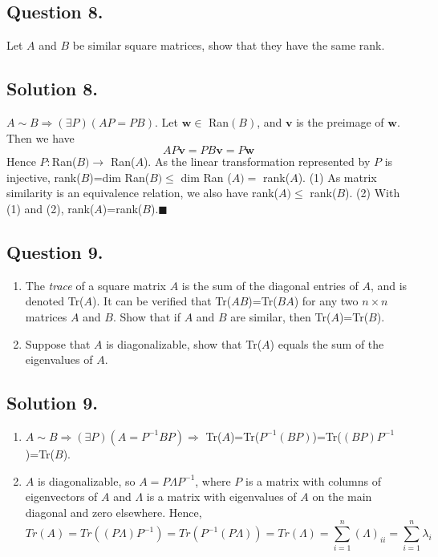 \documentclass{article}
\begin{document}
\subsection*{Question 8.}
Let $A$ and $B$ be similar square matrices, show that they have the same rank.
\subsection*{Solution 8.}
$A\sim B\Rightarrow (\exists P)(AP=PB)$.
Let $\mathbf{w}\in$ Ran$(B)$, and $\mathbf{v}$ is the preimage of $\mathbf{w}$. Then we have
\[AP\mathbf{v}=PB\mathbf{v}=P\mathbf{w}\]
Hence $P:$Ran($B)\to$ Ran($A$). \newline
As the linear transformation represented by $P$ is injective,\newline
rank($B$)=dim Ran($B)\leq$ dim Ran ($A)=$ rank($A$). (1) \newline
As matrix similarity is an equivalence relation, we also have rank($A)\leq$ rank($B$). (2) \newline
With (1) and (2), rank($A$)=rank($B$).$\blacksquare$
\subsection*{Question 9.}
\begin{enumerate} [label=(\arabic*)]
    \item The \textit{trace} of a square matrix $A$ is the sum of the diagonal entries of $A$, and is denoted Tr($A$). It can be verified that Tr($AB$)=Tr($BA$) for any two $n\times n$ matrices $A$ and $B$. Show that if $A$ and $B$ are similar, then Tr($A$)=Tr($B$).
    \item Suppose that $A$ is diagonalizable, show that Tr($A$) equals the sum of the eigenvalues of $A$.
\end{enumerate}
\subsection*{Solution 9.}
\begin{enumerate} [label=(\arabic*)]
    \item $A\sim B \Rightarrow (\exists P)(A=P^{-1}BP)\Rightarrow$ Tr($A$)=Tr($P^{-1}(BP)$)=Tr($(BP)P^{-1}$)=Tr($B$).
    \item $A$ is diagonalizable, so $A=P\Lambda P^{-1}$, where $P$ is a matrix with columns of eigenvectors of $A$ and $\Lambda$ is a matrix with eigenvalues of $A$ on the main diagonal and zero elsewhere. Hence, 
    \[Tr(A)=Tr((P\Lambda)P^{-1})=Tr(P^{-1}(P\Lambda))=Tr(\Lambda)=\sum _{i=1}^n (\Lambda)_{ii}=\sum_{i=1}^n \lambda_i\]
\end{enumerate}
\end{document}
